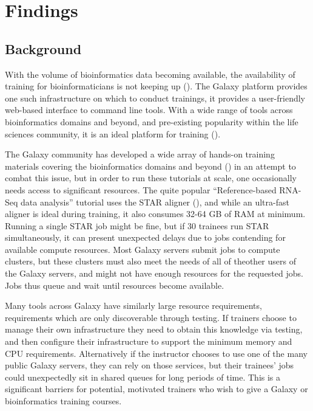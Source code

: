 \documentclass[a4paper,num-refs]{oup-contemporary}
\begin{document}
\section{Findings}
\subsection{Background}


With the volume of bioinformatics data becoming available, the availability of training for bioinformaticians is not keeping up (\cite{Attwood2017}).
The Galaxy platform \cite{afgan2018galaxy} provides one such infrastructure on which to conduct trainings, it provides a user-friendly web-based interface to command line tools. With a wide range of tools across bioinformatics domains and beyond, and pre-existing popularity within the life sciences community, it is an ideal platform for training (\cite{gtn}).

The Galaxy community has developed a wide array of hands-on training materials covering the bioinformatics domains and beyond (\cite{training-site}) in an attempt to combat this issue, but in order to run these tutorials at scale, one occasionally needs access to significant resources. The quite popular ``Reference-based RNA-Seq data analysis'' tutorial uses the STAR aligner (\cite{Dobin2012}), and while an ultra-fast aligner is ideal during training, it also consumes 32-64 GB of RAM at minimum. Running a single STAR job might be fine, but if 30 trainees run STAR simultaneously, it can present unexpected delays due to jobs contending for available compute resources. Most Galaxy servers submit jobs to compute clusters, but these clusters must also meet the needs of all of theother users of the Galaxy servers, and might not have enough resources for the requested jobs. Jobs thus queue and wait until resources become available.

Many tools across Galaxy have similarly large resource requirements, requirements which are only discoverable through testing. If trainers choose to manage their own infrastructure they need to obtain this knowledge via testing, and then configure their infrastructure to support the minimum memory and CPU requirements. Alternatively if the instructor chooses to use one of the many public Galaxy servers, they can rely on those services, but their trainees' jobs could unexpectedly sit in shared queues for long periods of time. This is a significant barriers for potential, motivated trainers who wish to give a Galaxy or bioinformatics training courses.
\end{document}
